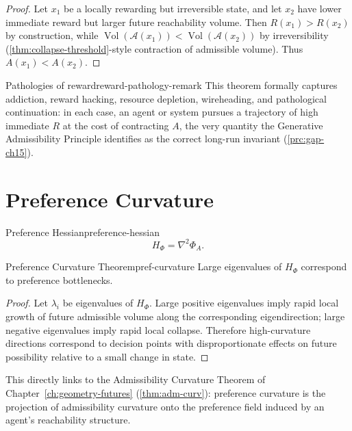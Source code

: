 \documentclass[12pt,twoside,openright]{book}
\newcommand{\adm}{\mathcal{A}}
\newcommand{\Vol}{\operatorname{Vol}}
\begin{document}
\begin{proof}
  Let $x_1$ be a locally rewarding but irreversible state,
  and let $x_2$ have lower immediate reward but larger
  future reachability volume. Then $R(x_1) > R(x_2)$ by
  construction, while $\Vol(\adm(x_1)) < \Vol(\adm(x_2))$
  by irreversibility (\cref{thm:collapse-threshold}-style
  contraction of admissible volume). Thus $A(x_1) < A(x_2)$.
\end{proof}

\begin{remark}{Pathologies of reward}{reward-pathology-remark}
  This theorem formally captures addiction, reward hacking,
  resource depletion, wireheading, and pathological
  continuation: in each case, an agent or system pursues a
  trajectory of high immediate $R$ at the cost of
  contracting $A$, the very quantity the Generative
  Admissibility Principle identifies as the correct
  long-run invariant (\cref{prc:gap-ch15}).
\end{remark}

\section{Preference Curvature}
\label{sec:ch22-curvature}

\begin{definition}{Preference Hessian}{preference-hessian}
  \[
    H_\Phi = \nabla^2 \Phi_A.
  \]
\end{definition}

\begin{theorem}{Preference Curvature Theorem}{pref-curvature}
  Large eigenvalues of $H_\Phi$ correspond to preference
  bottlenecks.
\end{theorem}

\begin{proof}
  Let $\lambda_i$ be eigenvalues of $H_\Phi$. Large positive
  eigenvalues imply rapid local growth of future admissible
  volume along the corresponding eigendirection; large
  negative eigenvalues imply rapid local collapse.
  Therefore high-curvature directions correspond to decision
  points with disproportionate effects on future possibility
  relative to a small change in state.
\end{proof}

This directly links to the Admissibility Curvature Theorem
of Chapter~\ref{ch:geometry-futures}
(\cref{thm:adm-curv}): preference curvature is the
projection of admissibility curvature onto the preference
field induced by an agent's reachability structure.
\end{document}
